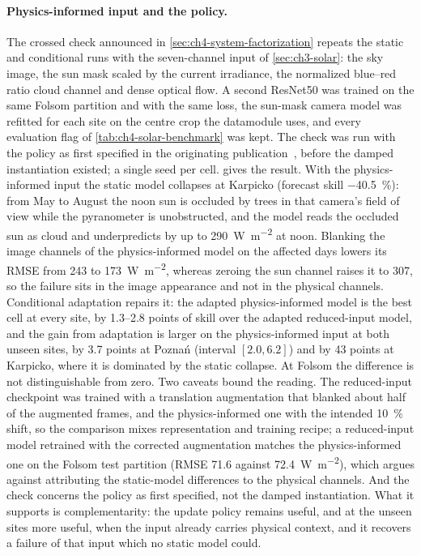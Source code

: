 \paragraph{Physics-informed input and the policy.} The crossed check announced in \cref{sec:ch4-system-factorization} repeats the static and conditional runs with the seven-channel input of \cref{sec:ch3-solar}: the sky image, the sun mask scaled by the current irradiance, the normalized blue--red ratio cloud channel and dense optical flow. A second ResNet50 was trained on the same Folsom partition and with the same loss, the sun-mask camera model was refitted for each site on the centre crop the datamodule uses, and every evaluation flag of \cref{tab:ch4-solar-benchmark} was kept. The check was run with the policy as first specified in the originating publication~\cite{10.1007/978-3-032-07343-328}, before the damped instantiation existed; a single seed per cell.  gives the result. With the physics-informed input the static model collapses at Karpicko (forecast skill \SI{-40.5}{\percent}): from May to August the noon sun is occluded by trees in that camera's field of view while the pyranometer is unobstructed, and the model reads the occluded sun as cloud and underpredicts by up to \SI{290}{\watt\per\square\meter} at noon. Blanking the image channels of the physics-informed model on the affected days lowers its RMSE from \num{243} to \SI{173}{\watt\per\square\meter}, whereas zeroing the sun channel raises it to \num{307}, so the failure sits in the image appearance and not in the physical channels. Conditional adaptation repairs it: the adapted physics-informed model is the best cell at every site, by \numrange{1.3}{2.8} points of skill over the adapted reduced-input model, and the gain from adaptation is larger on the physics-informed input at both unseen sites, by \num{3.7} points at Poznań (interval $[2.0, 6.2]$) and by \num{43} points at Karpicko, where it is dominated by the static collapse. At Folsom the difference is not distinguishable from zero. Two caveats bound the reading. The reduced-input checkpoint was trained with a translation augmentation that blanked about half of the augmented frames, and the physics-informed one with the intended \SI{10}{\percent} shift, so the comparison mixes representation and training recipe; a reduced-input model retrained with the corrected augmentation matches the physics-informed one on the Folsom test partition (RMSE \num{71.6} against \SI{72.4}{\watt\per\square\meter}), which argues against attributing the static-model differences to the physical channels. And the check concerns the policy as first specified, not the damped instantiation. What it supports is complementarity: the update policy remains useful, and at the unseen sites more useful, when the input already carries physical context, and it recovers a failure of that input which no static model could.


